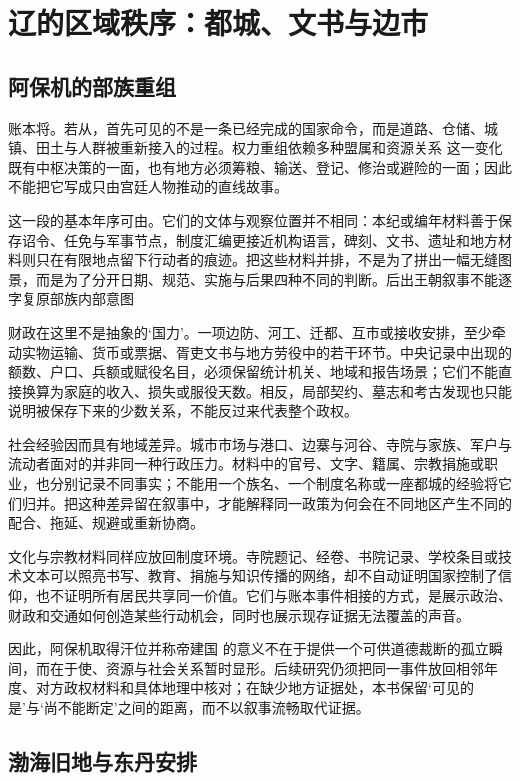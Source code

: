 \section{辽的区域秩序：都城、文书与边市}

\subsection{阿保机的部族重组}

账本将。若从，首先可见的不是一条已经完成的国家命令，而是道路、仓储、城镇、田土与人群被重新接入的过程。权力重组依赖多种盟属和资源关系 这一变化既有中枢决策的一面，也有地方必须筹粮、输送、登记、修治或避险的一面；因此不能把它写成只由宫廷人物推动的直线故事。

这一段的基本年序可由。它们的文体与观察位置并不相同：本纪或编年材料善于保存诏令、任免与军事节点，制度汇编更接近机构语言，碑刻、文书、遗址和地方材料则只在有限地点留下行动者的痕迹。把这些材料并排，不是为了拼出一幅无缝图景，而是为了分开日期、规范、实施与后果四种不同的判断。后出王朝叙事不能逐字复原部族内部意图

财政在这里不是抽象的‘国力’。一项边防、河工、迁都、互市或接收安排，至少牵动实物运输、货币或票据、胥吏文书与地方劳役中的若干环节。中央记录中出现的额数、户口、兵额或赋役名目，必须保留统计机关、地域和报告场景；它们不能直接换算为家庭的收入、损失或服役天数。相反，局部契约、墓志和考古发现也只能说明被保存下来的少数关系，不能反过来代表整个政权。

社会经验因而具有地域差异。城市市场与港口、边寨与河谷、寺院与家族、军户与流动者面对的并非同一种行政压力。材料中的官号、文字、籍属、宗教捐施或职业，也分别记录不同事实；不能用一个族名、一个制度名称或一座都城的经验将它们归并。把这种差异留在叙事中，才能解释同一政策为何会在不同地区产生不同的配合、拖延、规避或重新协商。

文化与宗教材料同样应放回制度环境。寺院题记、经卷、书院记录、学校条目或技术文本可以照亮书写、教育、捐施与知识传播的网络，却不自动证明国家控制了信仰，也不证明所有居民共享同一价值。它们与账本事件相接的方式，是展示政治、财政和交通如何创造某些行动机会，同时也展示现存证据无法覆盖的声音。

因此，阿保机取得汗位并称帝建国 的意义不在于提供一个可供道德裁断的孤立瞬间，而在于使、资源与社会关系暂时显形。后续研究仍须把同一事件放回相邻年度、对方政权材料和具体地理中核对；在缺少地方证据处，本书保留‘可见的是’与‘尚不能断定’之间的距离，而不以叙事流畅取代证据。

\subsection{渤海旧地与东丹安排}

